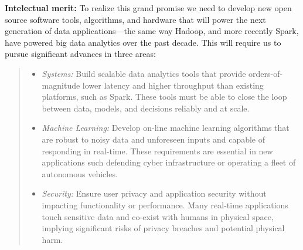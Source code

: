 \documentclass [10pt]{article}
\begin{document}
{{\bf Intelectual merit:} To realize this grand promise we need to develop new open source software tools, algorithms, and hardware that will power the next generation of data applications---the same way Hadoop, and more recently Spark, have powered big data analytics over the past decade. This will require us to pursue significant advances in three areas:
\begin{quote}
\begin{itemize}[noitemsep,topsep=0pt,parsep=0pt,partopsep=0pt]
\item  {\em Systems:} Build scalable data analytics tools that provide orders-of-magnitude lower latency and higher throughput than existing platforms, such as Spark. These tools must be able to close the loop between data, models, and decisions reliably and at scale.

\item {\em Machine Learning:} Develop on-line machine learning algorithms that are robust to noisy data and unforeseen inputs and capable of responding in real-time.  These requirements are essential in new applications such defending cyber infrastructure or operating a fleet of autonomous vehicles.

\item {\em Security:} Ensure user privacy and application security without impacting functionality or performance. 
Many real-time applications touch sensitive data and co-exist with humans in physical space, implying significant risks of privacy breaches and potential physical harm.  
\end{itemize}
\end{quote}

}
\end{document}
